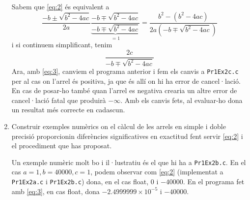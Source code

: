\documentclass[a4paper, 12pt]{article}
\begin{document}
\begin{exercici}
\begin{enumerate}[label=\alph*)]
\begin{solucio}
                Sabem que \eqref{eq:2} és equivalent a
                \begin{displaymath}
                    \frac{-b\pm\sqrt{b^2-4ac}}{2a} \underbrace{\frac{-b \mp \sqrt{b^2-4ac}}{-b \mp \sqrt{b^2-4ac}}}_{=1} = \frac{b^2-\left(b^2-4ac\right)}{2a\left(-b\mp\sqrt{b^2-4ac}\right)}
                \end{displaymath}
                i si continuem simplificant, tenim
                \begin{equation}
                    \frac{2c}{-b \mp \sqrt{b^2-4ac}}
                    \label{eq:3}
                \end{equation}
                Ara, amb \eqref{eq:3}, canviem el programa anterior i fem els canvis a \verb|Pr1Ex2c.c|
                per al cas on l'arrel és positiva, ja que és allí on hi ha error de cancel·lació. En
                cas de posar-ho també quan l'arrel es negativa crearia un altre error de 
                cancel·lació fatal que produirà $-\infty$. Amb els canvis fets, al evaluar-ho dona
                un resultat més correcte en cadascun. 
            \end{solucio}
            \item Construir exemples numèrics on el càlcul de les arrels en simple i doble precisió
            proporcionin diferències significatives en exactitud fent servir \eqref{eq:2} i el
            procediment que has proposat.\\
            \begin{solucio}
                Un exemple numèric molt bo i il·lustratiu és el que hi ha a \verb|Pr1Ex2b.c|.
                En el cas $a = 1, b = 40000, c = 1$, podem observar com \eqref{eq:2} (implementat a
                \verb|Pr1Ex2a.c| i \verb|Pr1Ex2b.c|) dona, en el cas float, $0$ i $-40000$. En el programa
                fet amb \eqref{eq:3}, en cas float, dona $-2.4999999 \times 10^{-5}$
                i $-40000$. 
            \end{solucio}
        \end{enumerate}
    \end{exercici}
    
\end{document}
